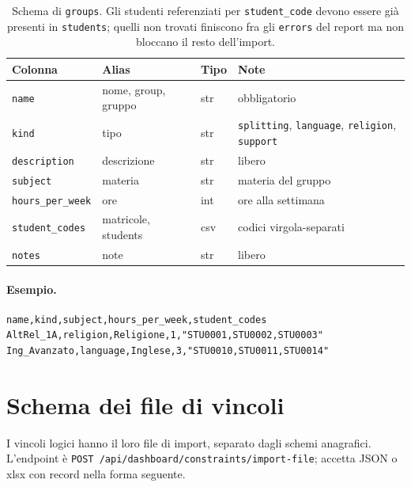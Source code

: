 \begin{table}[h]
\centering\small
\begin{tabular}{l l l p{4.6cm}}
\toprule
\textbf{Colonna} & \textbf{Alias} & \textbf{Tipo} & \textbf{Note} \\
\midrule
\texttt{name} & nome, group, gruppo & str & obbligatorio \\
\texttt{kind} & tipo & str & \texttt{splitting}, \texttt{language}, \texttt{religion}, \texttt{support} \\
\texttt{description} & descrizione & str & libero \\
\texttt{subject} & materia & str & materia del gruppo \\
\texttt{hours\_per\_week} & ore & int & ore alla settimana \\
\texttt{student\_codes} & matricole, students & csv & codici virgola-separati \\
\texttt{notes} & note & str & libero \\
\bottomrule
\end{tabular}
\caption{Schema di \texttt{groups}. Gli studenti referenziati per
\texttt{student\_code} devono essere gi\`a presenti in
\texttt{students}; quelli non trovati finiscono fra gli
\texttt{errors} del report ma non bloccano il resto dell'import.}
\label{tab:formato_groups}
\end{table}

\paragraph{Esempio.}
\begin{lstlisting}
name,kind,subject,hours_per_week,student_codes
AltRel_1A,religion,Religione,1,"STU0001,STU0002,STU0003"
Ing_Avanzato,language,Inglese,3,"STU0010,STU0011,STU0014"
\end{lstlisting}

\section{Schema dei file di vincoli}

I vincoli logici hanno il loro file di import, separato dagli
schemi anagrafici. L'endpoint \`e
\texttt{POST /api/dashboard/constraints/import-file}; accetta JSON
o xlsx con record nella forma seguente.

